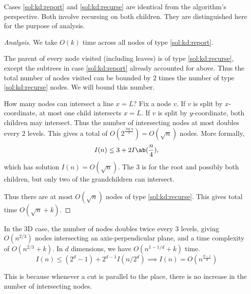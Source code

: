 \begin{remark}
    Cases \ref{sol:kd:report} and \ref{sol:kd:recurse} are identical from
    the algorithm's perspective.
    Both involve recursing on both children.
    They are distinguished here for the purpose of analysis.
\end{remark}
\begin{proof}[Analysis]
    We take $O(k)$ time across all nodes of type \ref*{sol:kd:report}.

    The parent of every node visited (including leaves) is of type
    \ref*{sol:kd:recurse}, except the subtrees in case \ref*{sol:kd:report}
    already accounted for above.
    Thus the total number of nodes visited can be bounded by $2$ times
    the number of type \ref*{sol:kd:recurse} nodes.
    We will bound this number.

    How many nodes can intersect a line $x = L$?
    Fix a node $v$.
    If $v$ is split by $x$-coordinate, at most one child intersects $x = L$.
    If $v$ is split by $y$-coordinate, both children may intersect.
    Thus the number of intersecting nodes at most doubles every $2$ levels.
    This gives a total of $O(2^{\frac{\log n}{2}}) = O(\sqrt n)$ nodes.
    More formally, \[
        I(n) \le 3 + 2I\ab(\frac n4),
    \] which has solution $I(n) = O(\sqrt n)$.
    The $3$ is for the root and possibly both children,
    but only two of the grandchildren can intersect.

    Thus there are at most $O(\sqrt n)$ nodes of type \ref*{sol:kd:recurse}.
    This gives total time $O(\sqrt n + k)$.
\end{proof}
In the 3D case, the number of nodes doubles twice every $3$ levels,
giving $O(n^{2/3})$ nodes intersecting an axis-perpendicular plane,
and a time complexity of $O(n^{2/3} + k)$.
In $d$ dimensions, we have $O(n^{1 - 1/d} + k)$ time. \[
    I(n) \le (2^d - 1) + 2^{d-1} I(n/2^d)
        \implies I(n) = O(n^{\frac{d-1}{d}})
\]

This is because whenever a cut is parallel to the place,
there is no increase in the number of intersecting nodes.
